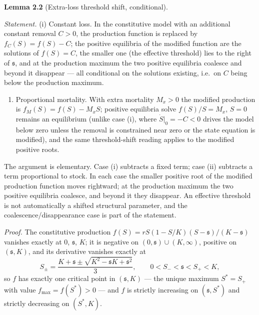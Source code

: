 \documentclass[11pt]{article}
\providecommand{\tightlist}{\setlength{\itemsep}{0pt}\setlength{\parskip}{0pt}}
\begin{document}
\textbf{Lemma 2.2} (Extra-loss threshold shift, conditional).

\emph{Statement.} (i) Constant loss. In the constitutive model with an
additional constant removal \(C>0\), the production function is replaced
by \(f_C(S)=f(S)-C\); the positive equilibria of the modified function
are the solutions of \(f(S)=C\), the smaller one (the effective
threshold) lies to the right of \(\mathfrak s\), and at the production
maximum the two positive equilibria coalesce and beyond it disappear ---
all conditional on the solutions existing, i.e.~on \(C\) being below the
production maximum.

\begin{enumerate}
\def\labelenumi{(\roman{enumi})}
\setcounter{enumi}{1}
\tightlist
\item
  Proportional mortality. With extra mortality \(M_x>0\) the modified
  production is \(f_M(S)=f(S)-M_xS\); positive equilibria solve
  \(f(S)/S=M_x\), \(S=0\) remains an equilibrium (unlike case (i), where
  \(\dot S|_0=-C<0\) drives the model below zero unless the removal is
  constrained near zero or the state equation is modified), and the same
  threshold-shift reading applies to the modified positive roots.
\end{enumerate}

The argument is elementary. Case (i) subtracts a fixed term; case (ii)
subtracts a term proportional to stock. In each case the smaller
positive root of the modified production function moves rightward; at
the production maximum the two positive equilibria coalesce, and beyond
it they disappear. An effective threshold is not automatically a shifted
structural parameter, and the coalescence/disappearance case is part of
the statement.

\emph{Proof.} The constitutive production
\(f(S) = rS(1-S/K)(S-\mathfrak s)/(K-\mathfrak s)\) vanishes exactly at
\(0\), \(\mathfrak s\), \(K\); it is negative on
\((0,\mathfrak s)\cup(K,\infty)\), positive on \((\mathfrak s,K)\), and
its derivative vanishes exactly at
\[S_{\pm} = \frac{K+\mathfrak s \pm \sqrt{K^2-\mathfrak s K+\mathfrak s^2}}{3}, \qquad 0 < S_- < \mathfrak s < S_+ < K,\]
so \(f\) has exactly one critical point in \((\mathfrak s,K)\) --- the
unique maximum \(S^* = S_+\) with value \(f_{\max} = f(S^*) > 0\) ---
and \(f\) is strictly increasing on \((\mathfrak s,S^*)\) and strictly
decreasing on \((S^*,K)\).
\end{document}
